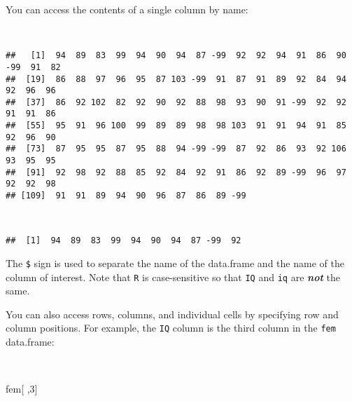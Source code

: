 \documentclass[
  12pt,
  a4paper]{book}
\newenvironment{Shaded}{\begin{snugshade}}{\end{snugshade}}
\newcommand{\DecValTok}[1]{\textcolor[rgb]{0.00,0.00,0.81}{#1}}
\newcommand{\NormalTok}[1]{#1}
\newcommand{\SpecialCharTok}[1]{\textcolor[rgb]{0.00,0.00,0.00}{#1}}
\begin{document}
You can access the contents of a single column by name:

~

\begin{Shaded}
\end{Shaded}

\begin{verbatim}
##   [1]  94  89  83  99  94  90  94  87 -99  92  92  94  91  86  90 -99  91  82
##  [19]  86  88  97  96  95  87 103 -99  91  87  91  89  92  84  94  92  96  96
##  [37]  86  92 102  82  92  90  92  88  98  93  90  91 -99  92  92  91  91  86
##  [55]  95  91  96 100  99  89  89  98  98 103  91  91  94  91  85  92  96  90
##  [73]  87  95  95  87  95  88  94 -99 -99  87  92  86  93  92 106  93  95  95
##  [91]  92  98  92  88  85  92  84  92  91  86  92  89 -99  96  97  92  92  98
## [109]  91  91  89  94  90  96  87  86  89 -99
\end{verbatim}

~

\begin{Shaded}
\end{Shaded}

\begin{verbatim}
##  [1]  94  89  83  99  94  90  94  87 -99  92
\end{verbatim}

\newpage

The \texttt{\$} sign is used to separate the name of the data.frame and the name of the column of interest. Note that \texttt{R} is case-sensitive so that \texttt{IQ} and \texttt{iq} are \textbf{\emph{not}} the same.

You can also access rows, columns, and individual cells by specifying row and column positions. For example, the \texttt{IQ} column is the third column in the \texttt{fem} data.frame:

~

\begin{Shaded}
\begin{Highlighting}[]
\NormalTok{fem[ ,}\DecValTok{3}\NormalTok{]}
\end{Highlighting}
\end{Shaded}
\end{document}
